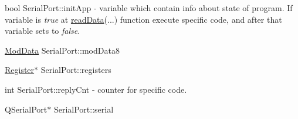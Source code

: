 \mbox{\label{classSerialPort_adf375ee179fa4844cadf65645ee7ab2f}} 
{\footnotesize\ttfamily bool Serial\+Port\+::\texorpdfstring{init\+App}{initApp}\hspace{0.3cm}{\ttfamily [private]}} - variable which contain info about state of program. If variable is \textit{true} at \hyperlink{classSerialPort_a0b8fe1371e829199856e8cae942de94e}{read\+Data}(...) function execute specific code, and after that variable sets to \textit{false}. 

\mbox{\label{classSerialPort_a1fbdedb09ef8f5d7ecb4e43e848d025f}} 
{\footnotesize\ttfamily \mbox{\hyperlink{serialport_8h_a2331c0232719069f0bce03c249d2eec6}{Mod\+Data}} Serial\+Port\+::\texorpdfstring{mod\+Data8}{modData8}\hspace{0.3cm}{\ttfamily [private]}}

\mbox{\label{classSerialPort_ab98c7d39235d59c2086d9f6e94c3ed4b}} 
{\footnotesize\ttfamily \mbox{\hyperlink{classRegister}{Register}}$\ast$ Serial\+Port\+::\texorpdfstring{registers}{registers}\hspace{0.3cm}{\ttfamily [private]}}

\mbox{\label{classSerialPort_a97937bbe34853205cbd02fb5ff97653d}} 
{\footnotesize\ttfamily int Serial\+Port\+::\texorpdfstring{reply\+Cnt}{replyCnt}\hspace{0.3cm}{\ttfamily [private]}} - counter for specific code.

\mbox{\label{classSerialPort_a54120d9040537e637eae7e8c048dec31}} 
{\footnotesize\ttfamily Q\+Serial\+Port$\ast$ Serial\+Port\+::\texorpdfstring{serial}{serial}\hspace{0.3cm}{\ttfamily [private]}}


